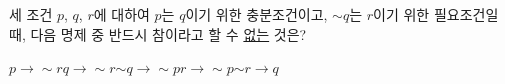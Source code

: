 세 조건 $p$, $q$, $r$에 대하여 $p$는 $q$이기 위한 충분조건이고, $\sim q$는 $r$이기 위한 필요조건일 때, 다음 명제 중 반드시 참이라고 할 수 \underline{없는} 것은?
\begin{choices32}{$p\longrightarrow \sim r$}{$q\longrightarrow \sim r$}{$\sim q\longrightarrow \sim p$}{$r\longrightarrow \sim p$}{$\sim r\longrightarrow q$}\end{choices32}
